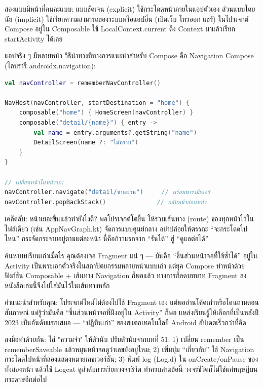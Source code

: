 สองแบบมีหน้าที่คนละแบบ: แบบชัดเจน (explicit) ใช้กระโดดหน้าภายในแอปตัวเอง ส่วนแบบโดยนัย (implicit) ใช้เรียกความสามารถของระบบหรือแอปอื่น (เปิดเว็บ โทรออก แชร์) ในโปรเจกต์ Compose อยู่ใน Composable ใช้ LocalContext.current ดึง Context มาแล้วเรียก startActivity ได้เลย


แอปจริง ๆ มีหลายหน้า วิธีนำทางที่ทางการแนะนำสำหรับ Compose คือ Navigation Compose (ไลบรารี androidx.navigation):

\begin{lstlisting}[language=Kotlin]
val navController = rememberNavController()

NavHost(navController, startDestination = "home") {
    composable("home") { HomeScreen(navController) }
    composable("detail/{name}") { entry ->
        val name = entry.arguments?.getString("name")
        DetailScreen(name ?: "ไม่ทราบ")
    }
}

// เปลี่ยนหน้าในหน้าจอ:
navController.navigate("detail/ซานผวน")     // พร้อมพารามิเตอร์
navController.popBackStack()              // กลับหน้าก่อนหน้า
\end{lstlisting}

\begin{tcbinfo}{เคล็ดลับ: หน้าเยอะขึ้นแล้วทำยังไงดี?}
พอโปรเจกต์โตขึ้น ให้รวมเส้นทาง (route) ของทุกหน้าไว้ในไฟล์เดียว (เช่น AppNavGraph.kt) จัดการแบบศูนย์กลาง อย่าปล่อยให้ตรรกะ “จะกระโดดไปไหน” กระจัดกระจายอยู่ตามแต่ละหน้า นี่คือก้าวแรกจาก “รันได้” สู่ “ดูแลต่อได้”

\end{tcbinfo}


ค้นหาบทเรียนเก่าเมื่อไร คุณต้องเจอ Fragment แน่ ๆ — มันคือ “ชิ้นส่วนหน้าจอที่ใช้ซ้ำได้” อยู่ใน Activity เป็นพระเอกตัวจริงในสถาปัตยกรรมหลายหน้าแบบเก่า แต่ยุค Compose ทำหน้าด้วยฟังก์ชัน Composable + เส้นทาง Navigation ก็พอแล้ว ทางการก็ลดบทบาท Fragment ลง หนังสือเล่มนี้จึงไม่ใส่มันไว้ในเส้นทางหลัก

คำแนะนำสำหรับคุณ: โปรเจกต์ใหม่ไม่ต้องไปใช้ Fragment เอง แต่พออ่านโค้ดเก่าหรือโดนถามตอนสัมภาษณ์ แค่รู้ว่ามันคือ “ชิ้นส่วนหน้าจอที่ฝังอยู่ใน Activity” ก็พอ แหล่งเรียนรู้ให้เลือกที่เป็นหลังปี 2023 เป็นอันดับแรกเสมอ — “ปฏิทินเก่า” ของสแตกเทคโนโลยี Android อัปเดตเร็วกว่าที่คิด

\begin{tcbpractice}{ลงมือทำด้วยกัน: ใส่ "ความจำ" ให้ตัวนับ}
ปรับตัวนับจากบทที่ 51: 1) เปลี่ยน remember เป็น rememberSaveable แล้วหมุนหน้าจอดูว่าเลขยังอยู่ไหม; 2) เพิ่มปุ่ม “เกี่ยวกับ” ใช้ Navigation กระโดดไปหน้าที่สองแสดงหมายเลขเวอร์ชัน; 3) พิมพ์ log (Log.d) ใน onCreate/onPause ของทั้งสองหน้า แล้วใช้ Logcat ดูลำดับการเรียกวงจรชีวิต ทำครบสามข้อนี้ วงจรชีวิตก็ไม่ใช่แค่ทฤษฎีบนกระดาษอีกต่อไป

\end{tcbpractice}

